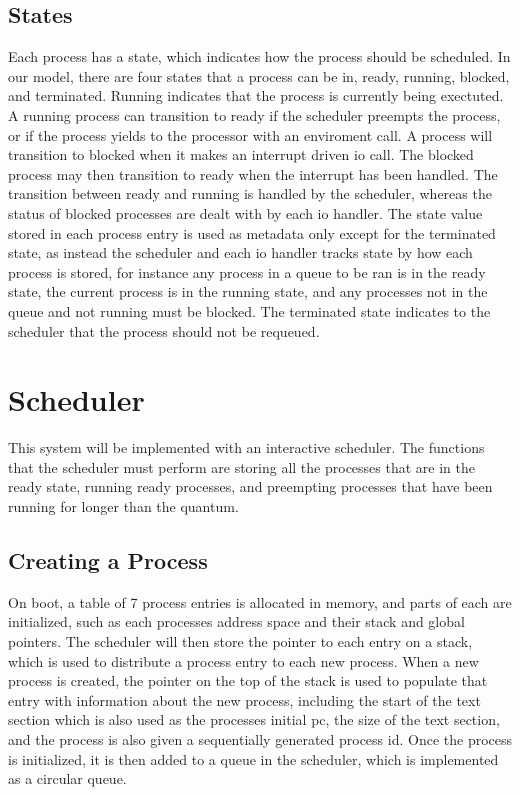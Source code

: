 \subsection{States}
Each process has a state, which indicates how the process should be scheduled. In our model, there are four states that a process can be in, ready, running, blocked, and terminated. Running indicates that the process is currently being exectuted. A running process can transition to ready if the scheduler preempts the process, or if the process yields to the processor with an enviroment call. A process will transition to blocked when it makes an interrupt driven \ac{io} call. The blocked process may then transition to ready when the interrupt has been handled. The transition between ready and running is handled by the scheduler, whereas the status of blocked processes are dealt with by each \ac{io} handler. The state value stored in each process entry is used as metadata only except for the terminated state, as instead the scheduler and each \ac{io} handler tracks state by how each process is stored, for instance any process in a queue to be ran is in the ready state, the current process is in the running state, and any processes not in the queue and not running must be blocked. The terminated state indicates to the scheduler that the process should not be requeued.
\section{Scheduler}
This system will be implemented with an interactive scheduler. The functions that the scheduler must perform are storing all the processes that are in the ready state, running ready processes, and preempting processes that have been running for longer than the \gls{quantum}.
\subsection{Creating a Process}
On boot, a table of 7 process entries is allocated in memory, and parts of each are initialized, such as each processes address space and their stack and global pointers. The scheduler will then store the pointer to each entry on a stack, which is used to distribute a process entry to each new process. When a new process is created, the pointer on the top of the stack is used to populate that entry with information about the new process, including the start of the text section which is also used as the processes initial pc, the size of the text section, and the process is also given a sequentially generated process id. Once the process is initialized, it is then added to a queue in the scheduler, which is implemented as a circular queue.
